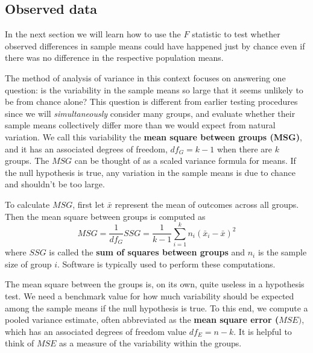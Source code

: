 \documentclass[
  10pt,
  openany]{book}
\begin{document}
\hypertarget{observed-data-18}{%
\subsection{Observed data}\label{observed-data-18}}

In the next section we will learn how to use the \(F\) statistic to test whether observed differences in sample means could have happened just by chance even if there was no difference in the respective population means.

The method of analysis of variance in this context focuses on answering one question: is the variability in the sample means so large that it seems unlikely to be from chance alone?
This question is different from earlier testing procedures since we will \emph{simultaneously} consider many groups, and evaluate whether their sample means collectively differ more than we would expect from natural variation.
We call this variability the \textbf{mean square between groups (MSG)}, and it has an associated degrees of freedom, \(df_{G} = k - 1\) when there are \(k\) groups.
The \(MSG\) can be thought of as a scaled variance formula for means.
If the null hypothesis is true, any variation in the sample means is due to chance and shouldn't be too large.

To calculate \(MSG\), first let \(\bar{x}\) represent the mean of outcomes across all groups. Then the mean square between groups is computed as
\[
MSG = \frac{1}{df_{G}}SSG = \frac{1}{k-1}\sum_{i=1}^{k} n_{i} \left(\bar{x}_{i} - \bar{x}\right)^2
\]
where \(SSG\) is called the \textbf{sum of squares between groups} and \(n_{i}\) is the sample size of group \(i.\) Software is typically used to perform these computations.


The mean square between the groups is, on its own, quite useless in a hypothesis test.
We need a benchmark value for how much variability should be expected among the sample means if the null hypothesis is true.
To this end, we compute a pooled variance estimate, often abbreviated as the \textbf{mean square error (}\(MSE)\), which has an associated degrees of freedom value \(df_E = n - k.\) It is helpful to think of \(MSE\) as a measure of the variability within the groups.
\end{document}
